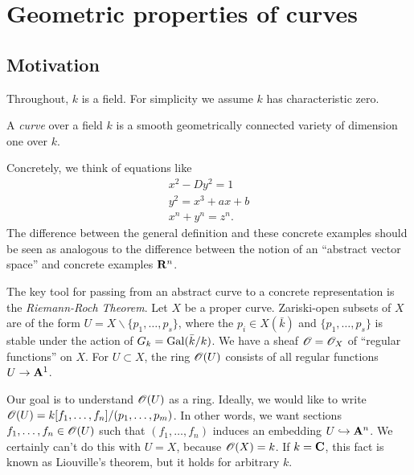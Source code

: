 
\section{Geometric properties of curves}





\subsection{Motivation}

Throughout, $k$ is a field. For simplicity we assume $k$ has characteristic 
zero. 

\begin{defi}
A \emph{curve} over a field $k$ is a smooth geometrically connected variety of 
dimension one over $k$. 
\end{defi}

Concretely, we think of equations like 
\begin{align*}
  x^2 - D y^2 = 1 \\
  y^2 = x^3 + a x+b \\
  x^n + y^n = z^n .
\end{align*}
The difference between the general definition and these concrete 
examples should be seen as analogous to the difference between the notion of 
an ``abstract vector space'' and concrete examples $\mathbf{R}^n$. 

The key tool for passing from an abstract curve to a concrete representation is 
the \emph{Riemann-Roch Theorem}. Let $X$ be a proper curve. Zariski-open 
subsets of $X$ are of the form $U=X\smallsetminus \{p_1,\dots,p_s\}$, where 
the $p_i\in X(\bar k)$ and $\{p_1,\dots,p_s\}$ is stable under the action of 
$G_k=\operatorname{Gal}(\bar k/k)$. We have a sheaf $\mathscr{O}=\mathscr{O}_X$ of ``regular functions'' 
on $X$. For $U\subset X$, the ring $\mathscr{O}(U)$ consists of all regular functions 
$U\to \mathbf{A}^1$. 

Our goal is to understand $\mathscr{O}(U)$ as a ring. Ideally, we would like to 
write $\mathscr{O}(U)=k[f_1,\dots,f_n]/(p_1,\dots,p_m)$. In other words, we want 
sections $f_1,\dots,f_n\in \mathscr{O}(U)$ such that $(f_1,\dots,f_n)$ induces an 
embedding $U\hookrightarrow \mathbf{A}^n$. We certainly can't do this with $U=X$, 
because $\mathscr{O}(X)=k$. If $k=\mathbf{C}$, this fact is known as Liouville's theorem, but 
it holds for arbitrary $k$. 





